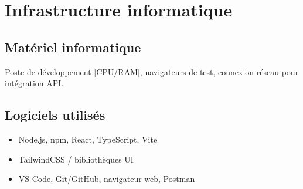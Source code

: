 \chapter{Infrastructure informatique}

\section{Matériel informatique}
Poste de développement [CPU/RAM], navigateurs de test, connexion réseau pour intégration API.

\section{Logiciels utilisés}
\begin{itemize}
  \item Node.js, npm, React, TypeScript, Vite
  \item TailwindCSS / bibliothèques UI
  \item VS Code, Git/GitHub, navigateur web, Postman
\end{itemize}
